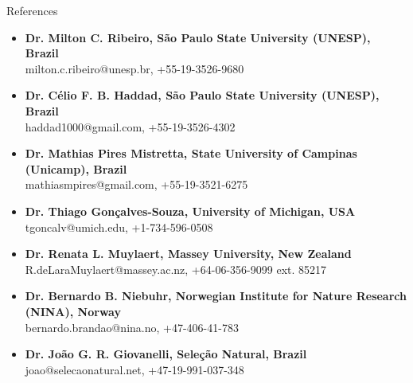\documentclass{resume}
\begin{document}
\begin{rSection}{References}
\begin{itemize}
\item {\bf Dr. Milton C. Ribeiro, São Paulo State University (UNESP), Brazil}\\
milton.c.ribeiro@unesp.br, +55-19-3526-9680
\item {\bf Dr. Célio F. B. Haddad, São Paulo State University (UNESP), Brazil}\\
haddad1000@gmail.com, +55-19-3526-4302
\item {\bf Dr. Mathias Pires Mistretta, State University of Campinas (Unicamp), Brazil}\\
mathiasmpires@gmail.com, +55-19-3521-6275
\item {\bf Dr. Thiago Gonçalves-Souza, University of Michigan, USA}\\
tgoncalv@umich.edu, +1-734-596-0508
\item {\bf Dr. Renata L. Muylaert, Massey University, New Zealand}\\
R.deLaraMuylaert@massey.ac.nz, +64-06-356-9099 ext. 85217
\item {\bf Dr. Bernardo B. Niebuhr, Norwegian Institute for Nature Research (NINA), Norway}\\
bernardo.brandao@nina.no, +47-406-41-783
\item {\bf Dr. João G. R. Giovanelli, Seleção Natural, Brazil}\\
joao@selecaonatural.net, +47-19-991-037-348
\end{itemize}
\end{rSection}
\end{document}
